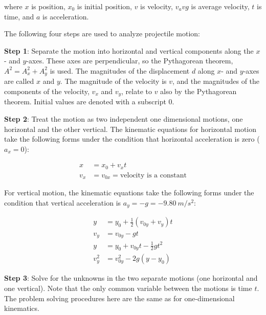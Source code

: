 \documentclass[main.tex]{subfiles}
\begin{document}
where $x$ is position, $x_0$ is initial position, $v$ is velocity, $v_avg$ is average velocity, $t$ is time, and $a$ is acceleration.

\vspace{1em}

The following four steps are used to analyze projectile motion:

\vspace{1em}

\textbf{Step 1}: Separate the motion into horizontal and vertical components along the $x$- and $y$-axes. These axes are perpendicular, so the Pythagorean theorem, $A^2 = A_x^2 + A_y^2$ is used. The magnitudes of the displacement $d$ along $x$- and $y$-axes are called $x$ and  $y$. The magnitude of the velocity is $v$, and the magnitudes of the components of the velocity, $v_x$ and $v_y$, relate to $v$ also by the Pythagorean theorem. Initial values are denoted with a subscript 0.

\vspace{1em}

\textbf{Step 2}: Treat the motion as two independent one dimensional motions, one horizontal and the other vertical. The kinematic equations for horizontal motion take the following forms under the condition that horizontal acceleration is zero ($a_x = 0$):

\begin{align}
    x &= x_0 + v_x t \label{7fMAPG}\\[0.5ex]
    v_x &= v_{0x} = \text{velocity is a constant} \label{dCvDf4}
\end{align}

For vertical motion, the kinematic equations take the following forms under the condition that vertical acceleration is $a_y = -g = \SI{-9.80}{m/s^2}$:

\begin{align}
    y &= y_0 + \frac{1}{2}\left(v_{0y} + v_y\right)t\\[0.5ex]
    v_y &= v_{0y} - gt \label{SjYaoE} \\[0.5ex]
    y &= y_0 + v_{0y}t - \frac{1}{2}  g t^2  \label{36YuvF} \\[0.5ex]
    v_y^2 &= v_{0y}^2 - 2 g (y - y_0) \label{wROSXN}
\end{align}

\vspace{1em}

\textbf{Step 3}: Solve for the unknowns in the two separate motions (one horizontal and one vertical). Note that the only common variable between the motions is time $t$. The problem solving procedures here are the same as for one-dimensional kinematics.
\end{document}
